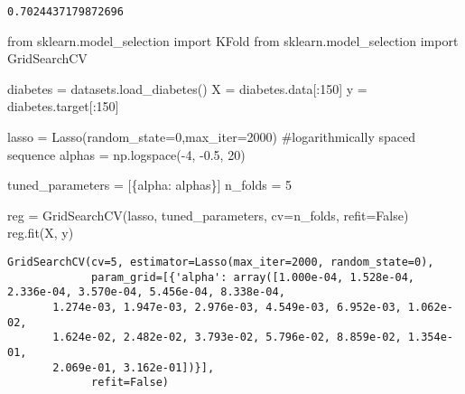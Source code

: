 \documentclass[
  letterpaper,
  DIV=11,
  numbers=noendperiod]{scrreprt}
\newenvironment{Shaded}{\begin{snugshade}}{\end{snugshade}}
\newcommand{\CommentTok}[1]{\textcolor[rgb]{0.37,0.37,0.37}{#1}}
\newcommand{\DecValTok}[1]{\textcolor[rgb]{0.68,0.00,0.00}{#1}}
\newcommand{\FloatTok}[1]{\textcolor[rgb]{0.68,0.00,0.00}{#1}}
\newcommand{\ImportTok}[1]{\textcolor[rgb]{0.00,0.46,0.62}{#1}}
\newcommand{\NormalTok}[1]{\textcolor[rgb]{0.00,0.23,0.31}{#1}}
\newcommand{\OperatorTok}[1]{\textcolor[rgb]{0.37,0.37,0.37}{#1}}
\newcommand{\StringTok}[1]{\textcolor[rgb]{0.13,0.47,0.30}{#1}}
\newcommand{\VariableTok}[1]{\textcolor[rgb]{0.07,0.07,0.07}{#1}}
\begin{document}
\begin{verbatim}
0.7024437179872696
\end{verbatim}

\begin{Shaded}
\begin{Highlighting}[]
\ImportTok{from}\NormalTok{ sklearn.model\_selection }\ImportTok{import}\NormalTok{ KFold}
\ImportTok{from}\NormalTok{ sklearn.model\_selection }\ImportTok{import}\NormalTok{ GridSearchCV}

\NormalTok{diabetes }\OperatorTok{=}\NormalTok{ datasets.load\_diabetes()}
\NormalTok{X }\OperatorTok{=}\NormalTok{ diabetes.data[:}\DecValTok{150}\NormalTok{]}
\NormalTok{y }\OperatorTok{=}\NormalTok{ diabetes.target[:}\DecValTok{150}\NormalTok{]}


\NormalTok{lasso }\OperatorTok{=}\NormalTok{ Lasso(random\_state}\OperatorTok{=}\DecValTok{0}\NormalTok{,max\_iter}\OperatorTok{=}\DecValTok{2000}\NormalTok{)}
\CommentTok{\#logarithmically spaced sequence}
\NormalTok{alphas }\OperatorTok{=}\NormalTok{ np.logspace(}\OperatorTok{{-}}\DecValTok{4}\NormalTok{, }\OperatorTok{{-}}\FloatTok{0.5}\NormalTok{, }\DecValTok{20}\NormalTok{)}

\NormalTok{tuned\_parameters }\OperatorTok{=}\NormalTok{ [\{}\StringTok{\textquotesingle{}alpha\textquotesingle{}}\NormalTok{: alphas\}]}
\NormalTok{n\_folds }\OperatorTok{=} \DecValTok{5}

\NormalTok{reg }\OperatorTok{=}\NormalTok{ GridSearchCV(lasso, tuned\_parameters, cv}\OperatorTok{=}\NormalTok{n\_folds, refit}\OperatorTok{=}\VariableTok{False}\NormalTok{)}
\NormalTok{reg.fit(X, y)}
\end{Highlighting}
\end{Shaded}

\begin{verbatim}
GridSearchCV(cv=5, estimator=Lasso(max_iter=2000, random_state=0),
             param_grid=[{'alpha': array([1.000e-04, 1.528e-04, 2.336e-04, 3.570e-04, 5.456e-04, 8.338e-04,
       1.274e-03, 1.947e-03, 2.976e-03, 4.549e-03, 6.952e-03, 1.062e-02,
       1.624e-02, 2.482e-02, 3.793e-02, 5.796e-02, 8.859e-02, 1.354e-01,
       2.069e-01, 3.162e-01])}],
             refit=False)
\end{verbatim}
\end{document}
